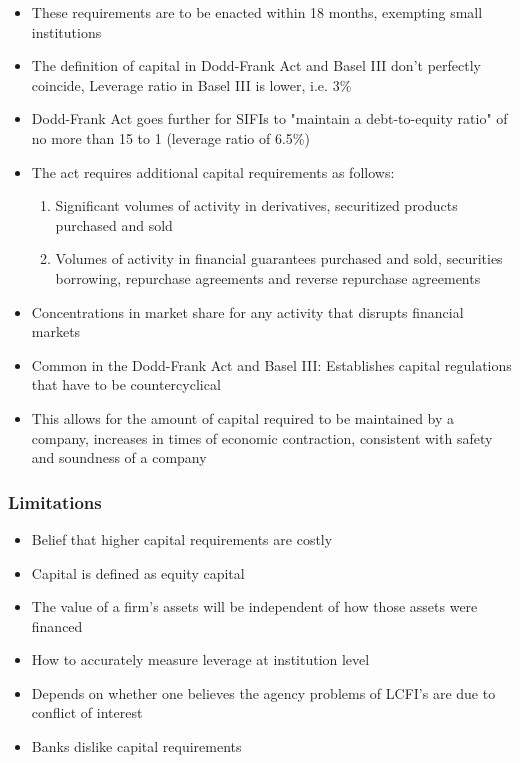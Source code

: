 \documentclass[11pt]{beamer}
\begin{document}
\begin{frame}
\begin{itemize}\itemsep10pt
\item These requirements are to be enacted within 18 months, exempting small institutions
\item The definition of capital in Dodd-Frank Act and Basel III don't perfectly coincide, Leverage ratio in Basel III is lower, i.e. 3\%
\item Dodd-Frank Act goes further for SIFIs to "maintain a debt-to-equity ratio" of no more than 15 to 1 (leverage ratio of 6.5\%)
\end{itemize}
\end{frame}

\begin{frame}
\begin{itemize}\itemsep10pt
\item The act requires additional capital requirements as follows:
\begin{enumerate}
\item Significant volumes of activity in derivatives, securitized products purchased and sold
\item Volumes of activity in financial guarantees purchased and sold, securities borrowing, repurchase agreements and reverse repurchase agreements
\end{enumerate}
\item Concentrations in market share for any activity that disrupts financial markets
\item Common in the Dodd-Frank Act and Basel III: Establishes capital regulations that have to be countercyclical
\item This allows for the amount of capital required to be maintained by a company, increases in times of economic contraction, consistent with safety and soundness of a company
\end{itemize}
\end{frame}

\begin{frame}
\frametitle{Limitations}
\begin{itemize}\itemsep10pt
\item Belief that higher capital requirements are costly
\item Capital is defined as equity capital
\item The value of a firm's assets will be independent of how those assets were financed
\item How to accurately measure leverage at institution level
\item Depends on whether one believes the agency problems of LCFI's are due to conflict of interest
\item Banks dislike capital requirements
\end{itemize}
\end{frame}
\end{document}
